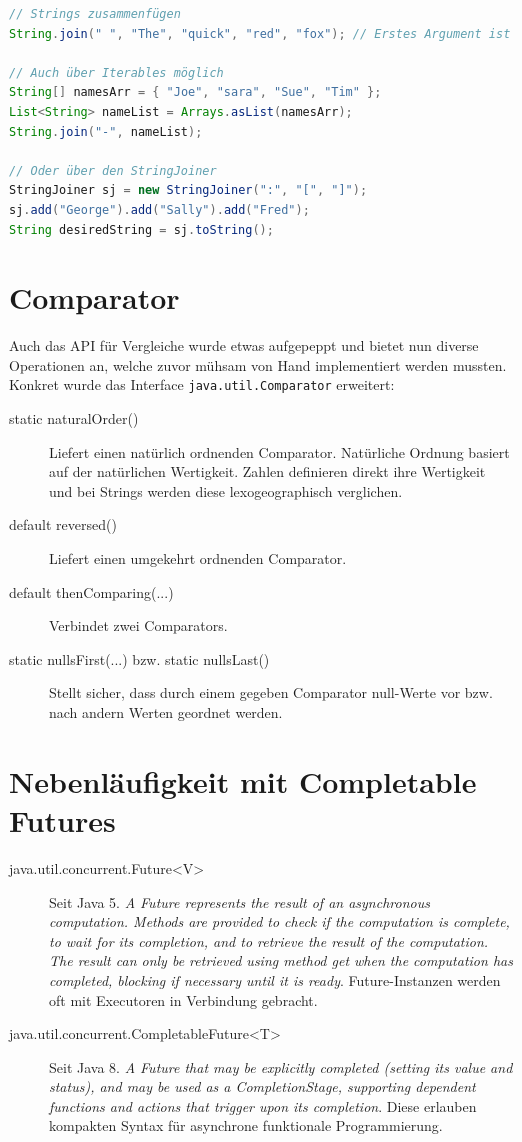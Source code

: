 \begin{lstlisting}[language=Java, caption=String]
// Strings zusammenfügen
String.join(" ", "The", "quick", "red", "fox"); // Erstes Argument ist delimiter

// Auch über Iterables möglich
String[] namesArr = { "Joe", "sara", "Sue", "Tim" };
List<String> nameList = Arrays.asList(namesArr);
String.join("-", nameList);

// Oder über den StringJoiner
StringJoiner sj = new StringJoiner(":", "[", "]");
sj.add("George").add("Sally").add("Fred");
String desiredString = sj.toString();
\end{lstlisting}

\section{Comparator}
Auch das API für Vergleiche wurde etwas aufgepeppt und bietet nun diverse Operationen an, welche zuvor mühsam von Hand implementiert werden mussten. Konkret wurde das Interface \verb|java.util.Comparator| erweitert:

\begin{description}
	\item[static naturalOrder()] Liefert einen natürlich ordnenden Comparator. Natürliche Ordnung basiert auf der natürlichen Wertigkeit. Zahlen definieren direkt ihre Wertigkeit und bei Strings werden diese lexogeographisch verglichen.
	\item[default reversed()] Liefert einen umgekehrt ordnenden Comparator.
	\item[default thenComparing(...)] Verbindet zwei Comparators.
	\item[static nullsFirst(...) bzw. static nullsLast()] Stellt sicher, dass durch einem gegeben Comparator null-Werte vor bzw. nach andern Werten geordnet werden.
\end{description}

\section{Nebenläufigkeit mit Completable Futures}
\begin{description}
	\item[java.util.concurrent.Future<V>] Seit Java 5. \emph{A Future represents the result of an	asynchronous computation. Methods are provided to	check if the computation is complete, to wait for its completion, and to retrieve the result of the computation. The result can only be retrieved using method get when the computation has completed, blocking if necessary until it is ready}. Future-Instanzen werden oft mit Executoren in Verbindung gebracht.
	\item[java.util.concurrent.CompletableFuture<T>] Seit Java 8. \emph{A Future that may be explicitly completed (setting its value and status), and may be used as a 	CompletionStage, supporting dependent functions and actions that trigger upon its completion}. Diese erlauben kompakten Syntax für asynchrone funktionale Programmierung.
\end{description}

